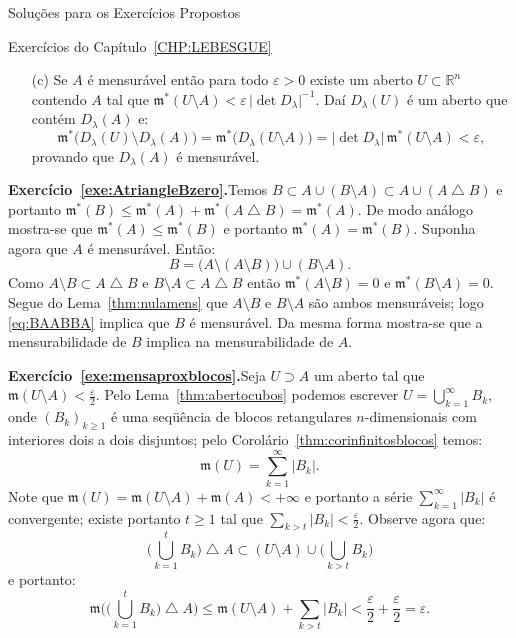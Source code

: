\documentclass[oneside,final,11pt]{amsbook}
\newcommand{\R}{\mathds R}
\newcommand{\leb}{\mathfrak m}
\theoremstyle{remark}\newtheorem{exercise}{Exercício}[chapter]
\theoremstyle{remark}\newtheorem{*exercise}[exercise]{\hbox to 0pt{\hskip 0pt minus 1fil*}Exercício}
\theoremstyle{definition}\newtheorem{exdefin}{Definição}[chapter]
\theoremstyle{plain}\newtheorem{teo}{Teorema}[section]
\theoremstyle{plain}\newtheorem{lem}[teo]{Lema}
\theoremstyle{plain}\newtheorem{prop}[teo]{Proposição}
\theoremstyle{plain}\newtheorem{cor}[teo]{Corolário}
\theoremstyle{definition}\newtheorem{defin}[teo]{Definição}
\theoremstyle{remark}\newtheorem{rem}[teo]{Observação}
\theoremstyle{definition}\newtheorem{notation}[teo]{Notação}
\theoremstyle{definition}\newtheorem{convention}[teo]{Convenção}
\theoremstyle{definition}\newtheorem{example}[teo]{Exemplo}
\numberwithin{section}{chapter}
\numberwithin{equation}{section}
\begin{document}
\begin{chapter}{Soluções para os Exercícios Propostos}
\begin{section}{Exercícios do Capítulo~\ref{CHP:LEBESGUE}}
\begin{itemize}
\smallskip

\item[(c)] Se $A$ é mensurável então para todo $\varepsilon>0$ existe um aberto $U\subset\R^n$
contendo $A$ tal que $\leb^*(U\setminus A)<\varepsilon\,\vert\det D_\lambda\vert^{-1}$.
Daí $D_\lambda(U)$ é um aberto que contém $D_\lambda(A)$ e:
\[\leb^*\big(D_\lambda(U)\setminus D_\lambda(A)\big)=\leb^*\big(D_\lambda(U\setminus A)\big)
=\vert\det D_\lambda\vert\,\leb^*(U\setminus A)<\varepsilon,\]
provando que $D_\lambda(A)$ é mensurável.
\end{itemize}

\medskip

\textbf{Exercício~\ref{exe:AtriangleBzero}.}\enspace Temos $B\subset A\cup(B\setminus A)\subset
A\cup(A\bigtriangleup B)$ e portanto $\leb^*(B)\le\leb^*(A)+\leb^*(A\bigtriangleup B)=\leb^*(A)$.
De modo análogo mostra-se que $\leb^*(A)\le\leb^*(B)$ e portanto $\leb^*(A)=\leb^*(B)$.
Suponha agora que $A$ é mensurável. Então:
\begin{equation}\label{eq:BAABBA}
B=\big(A\setminus(A\setminus B)\big)\cup(B\setminus A).
\end{equation}
Como $A\setminus B\subset A\bigtriangleup B$ e $B\setminus A\subset A\bigtriangleup B$ então
$\leb^*(A\setminus B)=0$ e $\leb^*(B\setminus A)=0$. Segue do Lema~\ref{thm:nulamens}
que $A\setminus B$ e $B\setminus A$ são ambos mensuráveis; logo \eqref{eq:BAABBA} implica
que $B$ é mensurável. Da mesma forma mostra-se que a mensurabilidade de $B$ implica
na mensurabilidade de $A$.

\medskip

\textbf{Exercício~\ref{exe:mensaproxblocos}.}\enspace Seja $U\supset A$ um aberto tal que
$\leb(U\setminus A)<\frac\varepsilon2$. Pelo Lema~\ref{thm:abertocubos} podemos escrever
$U=\bigcup_{k=1}^\infty B_k$, onde $(B_k)_{k\ge1}$ é uma seqüência de blocos retangulares
$n$-dimensionais com interiores dois a dois disjuntos; pelo Corolário~\ref{thm:corinfinitosblocos}
temos:
\[\leb(U)=\sum_{k=1}^\infty\vert B_k\vert.\]
Note que $\leb(U)=\leb(U\setminus A)+\leb(A)<+\infty$
e portanto a série $\sum_{k=1}^\infty\vert B_k\vert$ é convergente; existe portanto
$t\ge1$ tal que $\sum_{k>t}\vert B_k\vert<\frac\varepsilon2$. Observe agora que:
\[\Big(\bigcup_{k=1}^tB_k\Big)\bigtriangleup A\subset(U\setminus A)\cup\Big(\bigcup_{k>t}B_k\Big)\]
e portanto:
\[\leb\Big(\big({\textstyle\bigcup_{k=1}^t B_k}\big)\bigtriangleup A\Big)\le
\leb(U\setminus A)+\sum_{k>t}\vert B_k\vert<\frac\varepsilon2+\frac\varepsilon2=\varepsilon.\]


\end{section}
\end{chapter}
\end{document}

